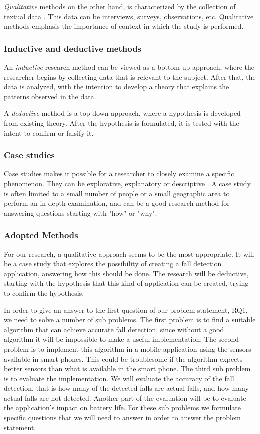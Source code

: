 \documentclass[12pt, a4paper, onecolumn]{article}
\begin{document}
	\textit{Qualitative} methods on the other hand, is characterized by the collection of textual data \cite[p~55]{borrego}. This data can be interviews, surveys, observations, etc. Qualitative methods emphasis the importance of context in which the study is performed.
	
	\subsubsection{Inductive and deductive methods}
	
	An \textit{inductive} research method can be viewed as a bottom-up approach, where the researcher begins by collecting data that is relevant to the subject. After that, the data is analyzed, with the intention to develop a theory that explains the patterns observed in the data.
	
	A \textit{deductive} method is a top-down approach, where a hypothesis is developed from existing theory. After the hypothesis is formulated, it is tested with the intent to confirm or falsify it.
	
	\subsubsection{Case studies}
	
	Case studies makes it possible for a researcher to closely examine a specific phenomenon. They can be explorative, explanatory or descriptive \cite[p~4]{yin}. A case study is often limited to a small number of people or a small geographic area to perform an in-depth examination, and can be a good research method for answering questions starting with "how" or "why".
	
	\subsubsection{Adopted Methods}
	
	For our research, a qualitative approach seems to be the most appropriate. It will be a case study that explores the possibility of creating a fall detection application, answering how this should be done. The research will be deductive, starting with the hypothesis that this kind of application can be created, trying to confirm the hypothesis. 
	
	In order to give an answer to the first question of our problem statement, RQ1, we need to solve a number of sub problems. The first problem is to find a suitable algorithm that can achieve accurate fall detection, since without a good algorithm it will be impossible to make a useful implementation. The second problem is to implement this algorithm in a mobile application using the sensors available in smart phones. This could be troublesome if the algorithm expects better sensors than what is available in the smart phone. The third sub problem is to evaluate the implementation. We will evaluate the accuracy of the fall detection, that is how many of the detected falls are actual falls, and how many actual falls are not detected. Another part of the evaluation will be to evaluate the application's impact on battery life. For these sub problems we formulate specific questions that we will need to answer in order to answer the problem statement.
	
\end{document}
